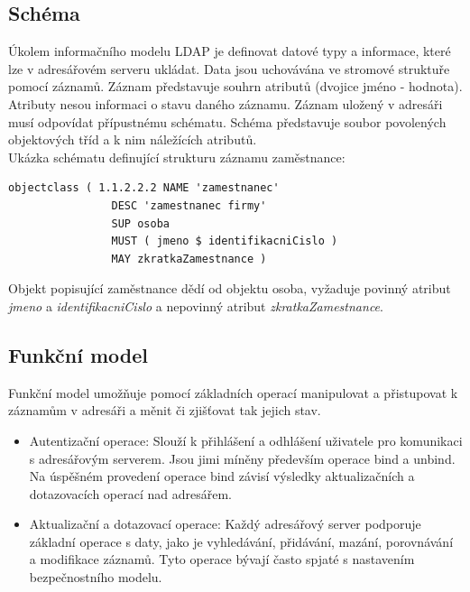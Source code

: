 \documentclass{diplomka}
\begin{document}
\subsection*{Schéma}
Úkolem informačního modelu LDAP je definovat datové typy a informace, které lze v adresářovém serveru ukládat. Data jsou uchovávána ve stromové struktuře pomocí záznamů. Záznam představuje souhrn atributů (dvojice jméno - hodnota). Atributy nesou informaci o stavu daného záznamu. Záznam uložený v adresáři musí odpovídat přípustnému schématu. Schéma  představuje soubor povolených objektových tříd a k nim náležících atributů.\\
Ukázka schématu definující strukturu záznamu zaměstnance:
\begin{verbatim}
objectclass ( 1.1.2.2.2 NAME 'zamestnanec'
                DESC 'zamestnanec firmy'
                SUP osoba
                MUST ( jmeno $ identifikacniCislo )
                MAY zkratkaZamestnance )
\end{verbatim}

Objekt popisující zaměstnance dědí od objektu osoba, vyžaduje povinný atribut \emph{jmeno} a \emph{identifikacniCislo} a nepovinný atribut \emph{zkratkaZamestnance}.

\subsection*{Funkční model}
Funkční model umožňuje pomocí základních operací manipulovat a přistupovat k záznamům v adresáři a měnit či zjišťovat tak jejich stav.
\begin{itemize}[noitemsep,nolistsep]
\item Autentizační operace: Slouží k přihlášení a odhlášení uživatele pro komunikaci s adresářovým serverem. Jsou jimi míněny především operace bind a unbind. Na úspěšném provedení operace bind závisí výsledky aktualizačních a dotazovacích operací nad adresářem.
\item Aktualizační a dotazovací operace: Každý adresářový server podporuje základní operace s daty, jako je vyhledávání, přidávání, mazání, porovnávání a modifikace záznamů. Tyto operace bývají často spjaté s nastavením bezpečnostního modelu.
\end{itemize}
\end{document}
